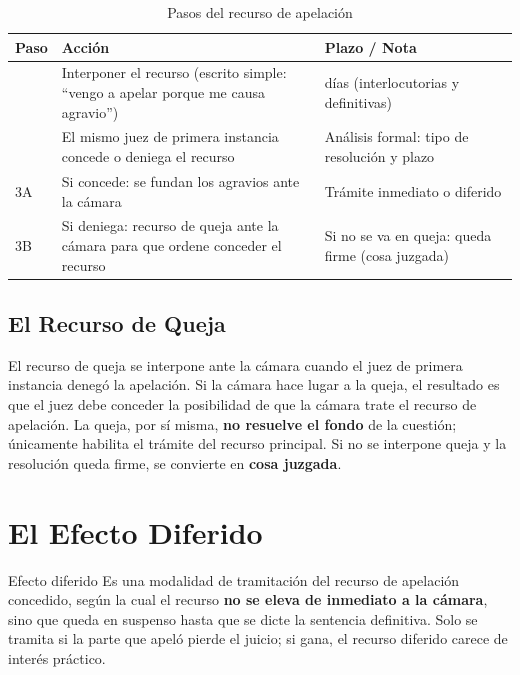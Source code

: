 \documentclass[12pt,oneside]{book}
\begin{document}
\begin{table}[H]
\centering
\begin{tabularx}{\textwidth}{
    >{\centering\arraybackslash}p{}
    >{\raggedright\arraybackslash}X
    >{\raggedright\arraybackslash}p{}
}
\toprule
\textbf{Paso} & \textbf{Acción} & \textbf{Plazo / Nota} \\
\midrule
1 & Interponer el recurso (escrito simple: ``vengo a apelar porque me causa agravio'') & 5 días (interlocutorias y definitivas) \\
\addlinespace
2 & El mismo juez de primera instancia concede o deniega el recurso & Análisis formal: tipo de resolución y plazo \\
\addlinespace
3A & Si concede: se fundan los agravios ante la cámara & Trámite inmediato o diferido \\
\addlinespace
3B & Si deniega: recurso de queja ante la cámara para que ordene conceder el recurso & Si no se va en queja: queda firme (cosa juzgada) \\
\bottomrule
\end{tabularx}
\caption{Pasos del recurso de apelación}
\end{table}

\subsection{El Recurso de Queja}

El recurso de queja se interpone ante la cámara cuando el juez de primera instancia denegó la apelación. Si la cámara hace lugar a la queja, el resultado es que el juez debe conceder la posibilidad de que la cámara trate el recurso de apelación. La queja, por sí misma, \textbf{no resuelve el fondo} de la cuestión; únicamente habilita el trámite del recurso principal. Si no se interpone queja y la resolución queda firme, se convierte en \textbf{cosa juzgada}.

\section{El Efecto Diferido}

\begin{definition}{Efecto diferido}
Es una modalidad de tramitación del recurso de apelación concedido, según la cual el recurso \textbf{no se eleva de inmediato a la cámara}, sino que queda en suspenso hasta que se dicte la sentencia definitiva. Solo se tramita si la parte que apeló pierde el juicio; si gana, el recurso diferido carece de interés práctico.
\end{definition}
\end{document}
